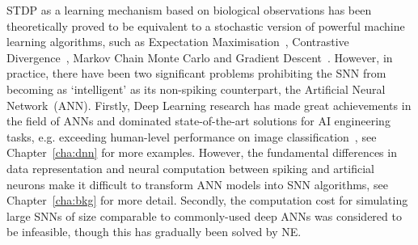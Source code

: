 STDP as a learning mechanism based on biological observations has been theoretically proved to be equivalent to a stochastic version of powerful machine learning algorithms, such as Expectation Maximisation~\citep{nessler2013bayesian}, Contrastive Divergence~\citep{neftci2013event}, Markov Chain Monte Carlo \citep{buesing2011neural} and Gradient Descent~\citep{o2016deep}.
However, in practice, there have been two significant problems prohibiting the SNN from becoming as `intelligent' as its non-spiking counterpart, the Artificial Neural Network~(ANN).
Firstly, Deep Learning research has made great achievements in the field of ANNs and dominated state-of-the-art solutions for AI engineering tasks, e.g. exceeding human-level performance on image classification~\citep{he2015delving}, see Chapter~\ref{cha:dnn} for more examples.
However, the fundamental differences in data representation and neural computation between spiking and artificial neurons make it difficult to transform ANN models into SNN algorithms, see Chapter~\ref{cha:bkg} for more detail.
Secondly, the computation cost for simulating large SNNs of size comparable to commonly-used deep ANNs was considered to be infeasible, though this has gradually been solved by NE.

